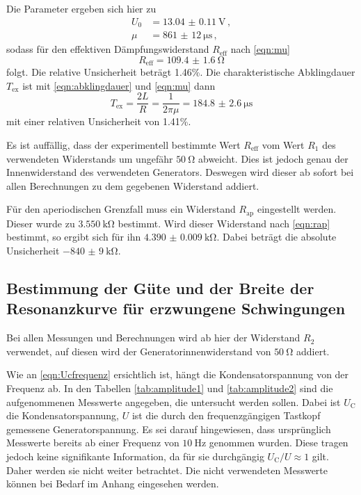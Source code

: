 Die Parameter ergeben sich hier zu
\begin{align*}
  U_0 &= \SI{13.04(011)}{\volt}\,, \\
  \mu &= \SI{861(12)}{\micro\second}\,,
\end{align*}
sodass für den effektiven Dämpfungswiderstand $R_\text{eff}$ nach \eqref{eqn:mu}
\begin{equation*}
  R_\text{eff} = \SI{109.4(16)}{\ohm}
\end{equation*}
folgt. Die relative Unsicherheit beträgt 1.46\%. Die charakteristische
Abklingdauer $T_\text{ex}$ ist mit \eqref{eqn:abklingdauer} und \eqref{eqn:mu} dann
\begin{equation*}
  T_\text{ex} = \frac{2L}{R} = \frac{1}{2\pi \mu} = \SI{184.8(26)}{\micro\second}
\end{equation*}
mit einer relativen Unsicherheit von 1.41\%.

Es ist auffällig, dass der experimentell bestimmte Wert $R_\text{eff}$ vom Wert $R_1$ des verwendeten
Widerstands um ungefähr $\SI{50}{\ohm}$ abweicht. Dies ist jedoch genau der Innenwiderstand
des verwendeten Generators. Deswegen wird dieser ab sofort bei allen Berechnungen zu dem
gegebenen Widerstand addiert.

Für den aperiodischen Grenzfall muss ein Widerstand $R_\text{ap}$ eingestellt werden.
Dieser wurde zu $\SI{3.550}{\kilo\ohm}$ bestimmt. Wird dieser Widerstand nach
\eqref{eqn:rap} bestimmt, so ergibt sich für ihn $\SI{4.390(0009)}{\kilo\ohm}$.
Dabei beträgt die absolute Unsicherheit $\SI{-840(9)}{\kilo\ohm}$.

\subsection{Bestimmung der Güte und der Breite der Resonanzkurve für erzwungene Schwingungen}
Bei allen Messungen und Berechnungen wird ab hier der Widerstand $R_2$ verwendet,
auf diesen wird der Generatorinnenwiderstand von $\SI{50}{\ohm}$ addiert.

Wie an \eqref{eqn:Ucfrequenz} ersichtlich ist, hängt die Kondensatorspannung von
der Frequenz ab. In den Tabellen \ref{tab:amplitude1} und \ref{tab:amplitude2} sind die aufgenommenen Messwerte
angegeben, die untersucht werden sollen. Dabei ist $U_\text{C}$ die Kondensatorspannung,
$U$ ist die durch den frequenzgängigen Tastkopf gemessene Generatorspannung.
Es sei darauf hingewiesen, dass ursprünglich Messwerte bereits ab einer
Frequenz von $\SI{10}{\hertz}$ genommen wurden. Diese tragen jedoch keine
signifikante Information, da für sie durchgängig $U_\text{C}/U \approx 1$ gilt.
Daher werden sie nicht weiter betrachtet. Die nicht verwendeten Messwerte können
bei Bedarf im Anhang eingesehen werden.

